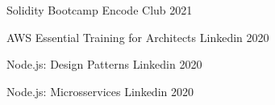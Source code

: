 

\begin{cvhonors}

  \cvhonor
    {Solidity Bootcamp} %
    {Encode Club} %
    {} %
    {2021} %

  \cvhonor
    {AWS Essential Training for Architects} %
    {Linkedin} %
    {} %
    {2020} %

  \cvhonor
    {Node.js: Design Patterns} %
    {Linkedin} %
    {} %
    {2020} %

  \cvhonor
    {Node.js: Microsservices} %
    {Linkedin} %
    {} %
    {2020} %
\end{cvhonors}
